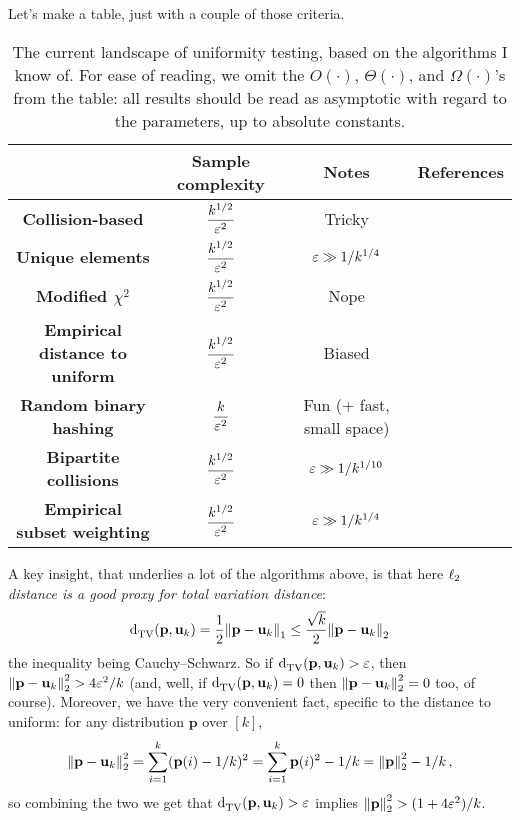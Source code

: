 \documentclass[10pt]{article}
\newcommand{\dst}{\eps}
\newcommand{\ab}{k}
\newcommand{\p}{\mathbf{p}}
\renewcommand{\uniform}{\mathbf{u}}
\begin{document}
\noindent Let's make a table, just with a couple of those criteria.
\begin{table}[H]\centering
  \def\arraystretch{2.75}%
  \begin{tabular}{|c|c|c|c|}
  \hline
     & \bf Sample complexity & \bf Notes & \bf References \\\hline
    \bf Collision-based & $\dfrac{\ab^{1/2}}{\dst^2}$ & Tricky & \cite{GoldreichR00,DiakonikolasGPP19} \\\hline
    \bf Unique elements & $\dfrac{\ab^{1/2}}{\dst^2}$ & $\dst \gg 1/\ab^{1/4}$ & \cite{Paninski08} \\\hline
    \bf Modified $\chi^2$ & $\dfrac{\ab^{1/2}}{\dst^2}$ & Nope & \cite{ValiantV17,AcharyaDK15,DiakonikolasKN15} \\\hline
    \bf Empirical distance to uniform & $\dfrac{\ab^{1/2}}{\dst^2}$ & Biased & \cite{DiakonikolasGPP18} \\\hline
    \bf Random binary hashing & $\dfrac{\ab}{\dst^2}$ & Fun (+ fast, small space) & \cite{AcharyaCT19b} \\\hline
    \bf Bipartite collisions & $\dfrac{\ab^{1/2}}{\dst^2}$ & $\dst \gg 1/\ab^{1/10}$ & \cite{DiakonikolasGKR19} \\\hline
    \bf Empirical subset weighting & $\dfrac{\ab^{1/2}}{\dst^2}$ & $\dst \gg 1/\ab^{1/4}$ &  \\\hline
  \end{tabular}
  \caption{The current landscape of uniformity testing, based on the algorithms I know of. For ease of reading, we omit the $O(\cdot)$, $\Theta(\cdot)$, and $\Omega(\cdot)$'s from the table: all results should be read as asymptotic with regard to the parameters, up to absolute constants.}
\end{table}

A key insight, that underlies a lot of the algorithms above, is that here \emph{$\lp[2]$ distance is a good proxy for total variation distance}:
\begin{equation}
  \totalvardist{\p}{\uniform_k} = \frac{1}{2}\normone{\p-\uniform_\ab} \leq \frac{\sqrt{\ab}}{2}\normtwo{\p-\uniform_\ab}
\end{equation}
the inequality being Cauchy--Schwarz. So if $\totalvardist{\p}{\uniform_k}>\dst$, then $\normtwo{\p-\uniform_\ab}^2 > 4\dst^2/\ab$ (and, well, if $\totalvardist{\p}{\uniform_k}=0$ then $\normtwo{\p-\uniform_\ab}^2=0$ too, of course). Moreover, we have the very convenient fact, specific to the distance to uniform: for any distribution $\p$ over $[\ab]$,
\begin{equation}
  \normtwo{\p-\uniform_\ab}^2 = \sum_{i=1}^\ab (\p(i)-1/\ab)^2  = \sum_{i=1}^\ab \p(i)^2-1/\ab = \normtwo{\p}^2-1/\ab\,,
\end{equation}
so combining the two we get that $\totalvardist{\p}{\uniform_k}>\dst$ implies $\normtwo{\p}^2 > (1+4\dst^2)/\ab$.
\end{document}
